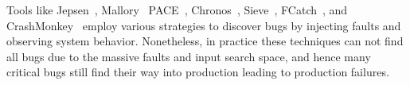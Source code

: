 
Tools like Jepsen~\cite{jepsen}, Mallory~\cite{mallory} PACE~\cite{AlagappanEtAl16-OSDI}, Chronos~\cite{chronos}, Sieve~\cite{sieve}, FCatch~\cite{fcatch}, and CrashMonkey~\cite{crashmonkey18mohan} employ various strategies to discover bugs by injecting faults and observing system behavior.
Nonetheless, in practice these techniques can not find all bugs due to the massive faults and input search space, and hence many critical bugs still find their way into production leading to production failures. 

